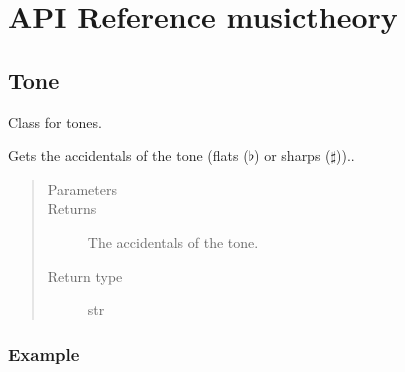 \documentclass[letterpaper,10pt,english]{sphinxmanual}
\begin{document}
\section{API Reference \sphinxhyphen{} musictheory}
\label{\detokenize{api:module-musictheory}}\label{\detokenize{api:api-reference-musictheory}}\label{\detokenize{api::doc}}

\subsection{Tone}
\label{\detokenize{api:tone}}

\begin{fulllineitems}
\label{\detokenize{api:musictheory.Tone}}
Class for tones.

\begin{fulllineitems}
\label{\detokenize{api:musictheory.Tone.get_accidentals}}
Gets the accidentals of the tone (flats (\(\flat\)) or sharps (\(\sharp\)))..
\begin{quote}\begin{description}
\item[{Parameters}] \leavevmode
{} \textendash{} 

\item[{Returns}] \leavevmode
The accidentals of the tone.

\item[{Return type}] \leavevmode
str

\end{description}\end{quote}
\subsubsection*{Example}


\end{fulllineitems}
\end{fulllineitems}
\end{document}
